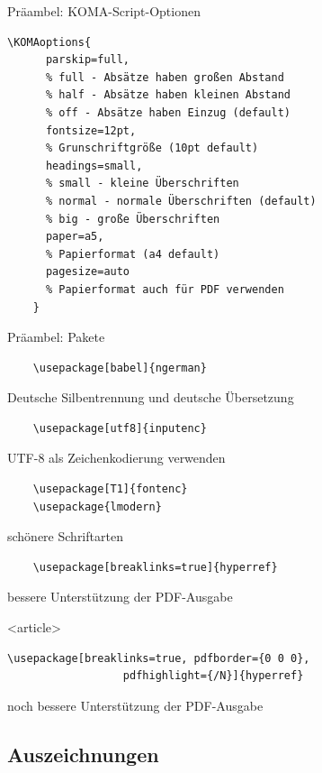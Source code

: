 \begin{Frame}[fragile]{Präambel: KOMA-Script-Optionen}
  \begin{lstlisting}[gobble=4]
    \KOMAoptions{
      parskip=full,
      % full - Absätze haben großen Abstand
      % half - Absätze haben kleinen Abstand
      % off - Absätze haben Einzug (default)
      fontsize=12pt,
      % Grunschriftgröße (10pt default)
      headings=small,
      % small - kleine Überschriften
      % normal - normale Überschriften (default)
      % big - große Überschriften
      paper=a5,
      % Papierformat (a4 default)
      pagesize=auto
      % Papierformat auch für PDF verwenden
    }
  \end{lstlisting}
\end{Frame}

\begin{Frame}[fragile]{Präambel: Pakete}
  \begin{lstlisting}
    \usepackage[babel]{ngerman}
  \end{lstlisting}
  Deutsche Silbentrennung und deutsche Übersetzung
  \begin{lstlisting}
    \usepackage[utf8]{inputenc}
  \end{lstlisting}
  UTF-8 als Zeichenkodierung verwenden
  \begin{lstlisting}
    \usepackage[T1]{fontenc}
    \usepackage{lmodern}
  \end{lstlisting}
  schönere Schriftarten
  \begin{lstlisting}
    \usepackage[breaklinks=true]{hyperref}
  \end{lstlisting}
  bessere Unterstützung der PDF-Ausgabe
  \begin{onlyenv}<article>
    \begin{lstlisting}[gobble=6]
      \usepackage[breaklinks=true, pdfborder={0 0 0},
                  pdfhighlight={/N}]{hyperref}
    \end{lstlisting}
    noch bessere Unterstützung der PDF-Ausgabe
  \end{onlyenv}
\end{Frame}

\subsection{Auszeichnungen}

